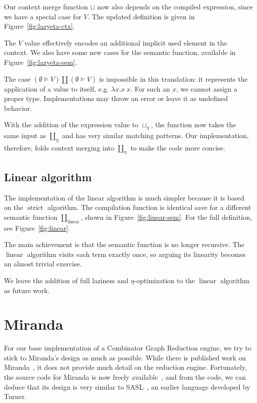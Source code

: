 \documentclass[conference]{IEEEtran}
\DeclareMathOperator{\strict}{strict}
\DeclareMathOperator{\linear}{linear}
\begin{document}
Our context merge function $\sqcup$ now also depends on the compiled expression, since we have a special case for $V$.
The updated definition is given in Figure~\ref{fig:lazyeta-ctx}.

The $V$ value effectively encodes an additional implicit used element in the context.
We also have some new cases for the semantic function, available in Figure~\ref{fig:lazyeta-sem}.

The case $(\emptyset \models V) \coprod (\emptyset \models V) $ is impossible in this translation:
it represents the application of a value to itself, e.g. $\lambda x. x\ x$.
For such an $x$, we cannot assign a proper type.
Implementations may throw an error or leave it as undefined behavior.

With the addition of the expression value to $\sqcup_\eta$, the function now takes the same input as $\coprod_\eta$ and has very similar matching patterns.
Our implementation, therefore, folds context merging into $\coprod_\eta$ to make the code more concise.

\subsection{Linear algorithm}
The implementation of the linear algorithm is much simpler because it is based on the $\strict$ algorithm.
The compilation function is identical save for a different semantic function $\coprod_{\text{linear}}$, shown in Figure~\ref{fig:linear-sem}.
For the full definition, see Figure~\ref{fig:linear}.

The main achievement is that the semantic function is no longer recursive.
The $\linear$ algorithm visits each term exactly once, so arguing its linearity becomes an almost trivial exercise.

We leave the addition of full laziness and $\eta$-optimization to the $\linear$ algorithm as future work.

\section{Miranda}
\label{sec:miranda}
For our base implementation of a Combinator Graph Reduction engine, we try to stick to Miranda's design as much as possible.
While there is published work on Miranda~\cite{turner_miranda_1985}, it does not provide much detail on the reduction engine.
Fortunately, the source code for Miranda is now freely available~\cite{turner_open_2021}, and from the code, we can deduce that its design is very similar to SASL~\cite{turner_new_1979}, an earlier language developed by Turner.
\end{document}
